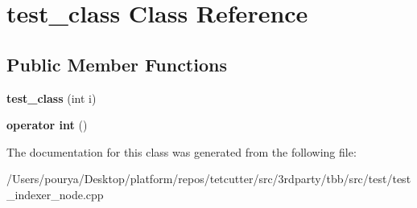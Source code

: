 \hypertarget{classtest__class}{}\section{test\+\_\+class Class Reference}
\label{classtest__class}
\subsection*{Public Member Functions}
\begin{DoxyCompactItemize}
\item 
\hypertarget{classtest__class_a714b52964bade2582ce7d66bf0c07fd5}{}{\bfseries test\+\_\+class} (int i)\label{classtest__class_a714b52964bade2582ce7d66bf0c07fd5}

\item 
\hypertarget{classtest__class_a3aba7ac99d65ba016b922a21bcf7736a}{}{\bfseries operator int} ()\label{classtest__class_a3aba7ac99d65ba016b922a21bcf7736a}

\end{DoxyCompactItemize}


The documentation for this class was generated from the following file\+:\begin{DoxyCompactItemize}
\item 
/\+Users/pourya/\+Desktop/platform/repos/tetcutter/src/3rdparty/tbb/src/test/test\+\_\+indexer\+\_\+node.\+cpp\end{DoxyCompactItemize}
